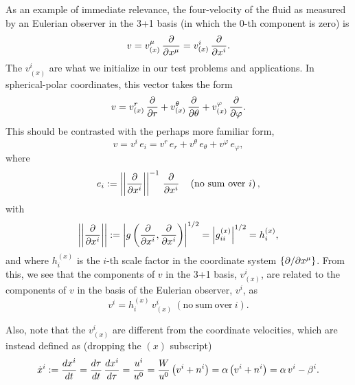 As an example of immediate relevance,
the four-velocity of the fluid as measured by an Eulerian observer
in the 3+1 basis (in which the 0-th component is zero) is
\begin{equation}
  v=v_{\left(x\right)}^{\mu}\,\frac{\partial}{\partial x^{\mu}}
  =v_{\left(x\right)}^{i}\,\frac{\partial}{\partial x^{i}}.
\end{equation}
The $v_{\left(x\right)}^{i}$
are what we initialize in our test problems and applications.
In spherical-polar coordinates, this vector takes the form
\begin{equation}
  v=v_{\left(x\right)}^{r}\,\frac{\partial}{\partial r}
  +v_{\left(x\right)}^{\theta}\,\frac{\partial}{\partial\theta}
  +v_{\left(x\right)}^{\varphi}\,\frac{\partial}{\partial\varphi}.
\end{equation}
This should be contrasted with the perhaps more familiar form,
\begin{equation}
  v=v^{i}\,e_{i}
  =v^{r}\,e_{r}+v^{\theta}\,e_{\theta}
  +v^{\varphi}\,e_{\varphi},
\end{equation}
where
\begin{equation}
  e_{i}:=\left|\left|\pd{}{x^{i}}\right|\right|^{-1}\,
  \pd{}{x^{i}}\hspace{1em}\left(\mathrm{no\ sum\ over\ }i\right),
\end{equation}
with
\begin{equation}
  \left|\left|\frac{\partial}{\partial x^{i}}\right|\right|
  :=\left|g\left(\frac{\partial}{\partial x^{i}},
  \frac{\partial}{\partial x^{i}}\right)\right|^{1/2}
  =\left|g^{\left(x\right)}_{ii}\right|^{1/2}=h^{\left(x\right)}_{i},
\end{equation}
and where $h^{\left(x\right)}_{i}$ is the $i$-th scale factor in the
coordinate system $\left\{\partial/\partial x^{\mu}\right\}$.
From this, we see that the components of $v$ in the 3+1 basis,
$v_{\left(x\right)}^{i}$,
are related to the components of $v$ in the basis of the Eulerian
observer, $v^{i}$, as
\begin{equation}
  v^{i}
  =h^{\left(x\right)}_{i}\,v_{\left(x\right)}^{i}
  \ \left(\mathrm{no\ sum\ over\ }i\right).
\end{equation}

Also, note that the $v_{\left(x\right)}^{i}$ are different from
the coordinate velocities,
which are instead defined as (dropping the $\left(x\right)$ subscript)
\begin{equation}
  \dot{x}^{i}:=\frac{dx^{i}}{dt}
  =\frac{d\tau}{dt}\,\frac{dx^{i}}{d\tau}
  =\frac{u^{i}}{u^{0}}
  =\frac{W}{u^{0}}\left(v^{i}+n^{i}\right)
  =\alpha\left(v^{i}+n^{i}\right)
  =\alpha\,v^{i}-\beta^{i}.
\end{equation}


